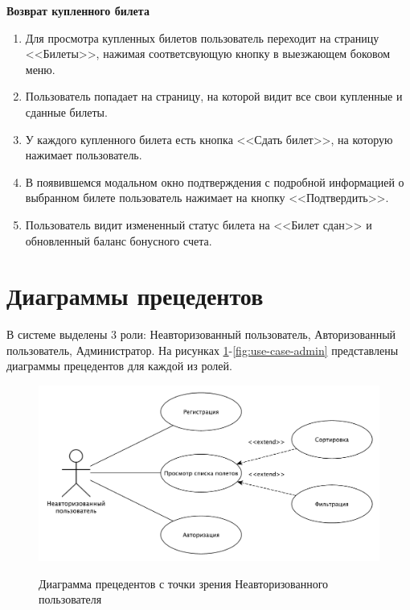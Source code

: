 \textbf{Возврат купленного билета}
\begin{enumerate}
	\item Для просмотра купленных билетов пользователь переходит на страницу <<Билеты>>, нажимая соответсвующую кнопку в выезжающем боковом меню.
	\item Пользователь попадает на страницу, на которой видит все свои купленные и сданные билеты.
	\item У каждого купленного билета есть кнопка <<Сдать билет>>, на которую нажимает пользователь.
	\item В появившемся модальном окно подтверждения с подробной информацией о выбранном билете пользователь нажимает на кнопку <<Подтвердить>>.
  \item Пользователь видит измененный статус билета на <<Билет сдан>> и обновленный баланс бонусного счета.
\end{enumerate}


\section{Диаграммы прецедентов}
В системе выделены 3 роли: Неавторизованный пользователь, Авторизованный пользователь, Администратор. На рисунках \ref{fig:use-case-non-auth}-\ref{fig:use-case-admin} представлены диаграммы прецедентов для каждой из ролей.

\begin{figure}[H]
	\begin{center}
		{\includegraphics[scale = 0.5]{../img/use-case/non-auth-user.pdf}}
		\caption{Диаграмма прецедентов с точки зрения Неавторизованного пользователя}
		\label{fig:use-case-non-auth}
	\end{center}
\end{figure}

